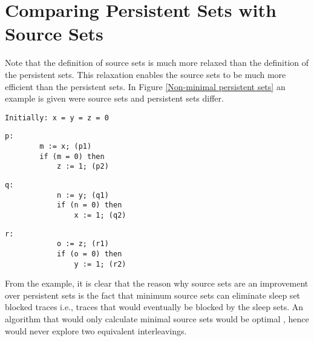 \section{Comparing Persistent Sets with Source Sets}

Note that the definition of source sets is much more relaxed than the definition of the persistent sets. 
This relaxation enables the source sets to be much more efficient than the persistent sets. In Figure \ref{Non-minimal persistent sets}
an example is given were source sets and persistent sets differ.

\begin{figure*}
    \begin{lstlisting}[frame=none,numbers=none]
        Initially: x = y = z = 0 
    \end{lstlisting}
    \begin{minipage}{0.3\textwidth}
      \begin{lstlisting}[frame=none, numbers=none]
        p:
        m := x; (p1)
        if (m = 0) then
            z := 1; (p2)
      \end{lstlisting}
    \end{minipage}
    \begin{minipage}{0.3\textwidth}
        \begin{lstlisting}[frame=none, numbers=none]
            q:
            n := y; (q1)
            if (n = 0) then
                x := 1; (q2)
        \end{lstlisting}
      \end{minipage}
      \begin{minipage}{0.3\textwidth}
        \begin{lstlisting}[frame=none, numbers=none]
            r:
            o := z; (r1)
            if (o = 0) then
                y := 1; (r2)
        \end{lstlisting}
      \end{minipage}
      \caption{Program with non-minimal persistent sets}
      \label{Non-minimal persistent sets}
  \end{figure*}

From the example, it is clear that the reason why source sets are an improvement over persistent sets is the fact that minimum source sets can eliminate
sleep set blocked traces i.e., traces that would eventually be blocked by the sleep sets. An algorithm that would only calculate minimal source sets would be optimal \cite{AbdullaAronisJohnssonSagonasDPOR2014}, hence
would never explore two equivalent interleavings.

